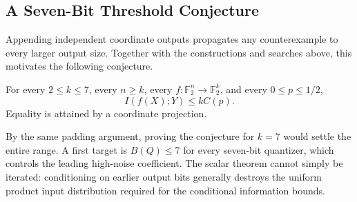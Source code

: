 \subsection{A Seven-Bit Threshold Conjecture}
\label{subsec:seven-bit-conjecture}

Appending independent coordinate outputs propagates any counterexample
to every larger output size. Together with the constructions and
searches above, this motivates the following conjecture.

\begin{conjecture}
\label{conj:seven-bit-threshold}
For every \(2\leq k\leq7\), every \(n\geq k\), every
\(f:\mathbb F_2^n\to\mathbb F_2^k\), and every \(0\leq p\leq1/2\),
\begin{equation}
 I(f(X);Y)\leq kC(p).
 \label{eq:seven-bit-conjecture}
\end{equation}
Equality is attained by a coordinate projection.
\end{conjecture}

By the same padding argument, proving the conjecture for \(k=7\)
would settle the entire range. A first target is \(B(Q)\leq7\)
for every seven-bit quantizer, which controls the leading high-noise
coefficient. The scalar theorem cannot simply be iterated: conditioning
on earlier output bits generally destroys the uniform product input
distribution required for the conditional information bounds.
